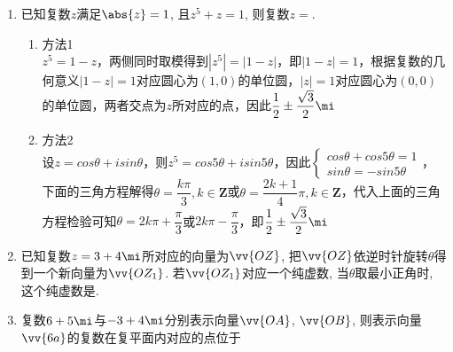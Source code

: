 \begin{enumerate}
    \item 已知复数$z$满足$\abs{z}=1$, 且$z^5+z=1$, 则复数$z=$.
    \begin{jieda}
        \begin{enumerate}
            \item 方法1 \\
            $z^5 = 1-z$，两侧同时取模得到$|z^5| = |1-z|$，即$|1-z| = 1$，根据复数的几何意义$|1-z| = 1$对应圆心为$(1, 0)$的单位圆，$|z| = 1$对应圆心为$(0, 0)$的单位圆，两者交点为$z$所对应的点，因此$\dfrac{1}{2}\pm\dfrac{\sqrt{3}}{2}\mi$
            \item 方法2 \\
            设$z = cos\theta + i sin\theta$，则$z^5 = cos5\theta+isin5\theta$，因此$\left\{\begin{array}{l}
                 cos\theta + cos5\theta = 1 \\
                 sin\theta = -sin5\theta
            \end{array}\right.$，下面的三角方程解得$\theta = \dfrac{k\pi}{3}, k \in \mathbf{Z}$或$\theta = \dfrac{2k+1}{4}\pi, k \in \mathbf{Z}$，代入上面的三角方程检验可知$\theta = 2k\pi + \dfrac{\pi}{3}$或$2k\pi - \dfrac{\pi}{3}$，即$\dfrac{1}{2}\pm\dfrac{\sqrt{3}}{2}\mi$
        \end{enumerate}
    \end{jieda}
    
    \item 已知复数$z=3+4\mi$所对应的向量为$\vv{OZ}$, 把$\vv{OZ}$依逆时针旋转$\theta$得到一个新向量为$\vv{OZ_1}$. 若$\vv{OZ_1}$对应一个纯虚数, 
    当$\theta$取最小正角时, 这个纯虚数是\blkda{$5\mi$}. 
    
    \item 复数$6+5\mi$与$-3+4\mi$分别表示向量$\vv{OA}$, $\vv{OB}$, 则表示向量$\vv{6a}$的复数在复平面内对应的点位于


\end{enumerate}
